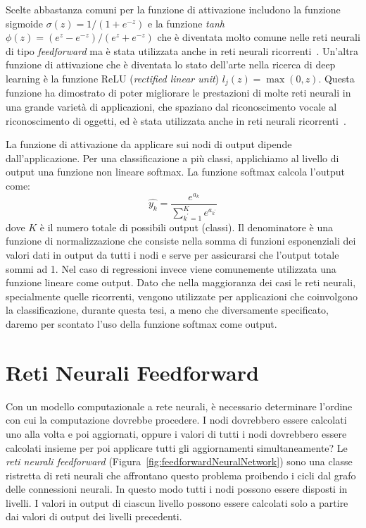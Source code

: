 Scelte abbastanza comuni per la funzione di attivazione includono la funzione
sigmoide $\sigma(z) = 1/(1+e^{-z})$ e la funzione \emph{tanh}
$\phi(z)=(e^z-e^{-z})/(e^z+e^{-z})$ che \`e diventata molto comune nelle reti
neurali di tipo \emph{feedforward} ma \`e stata utilizzata anche in reti neurali
ricorrenti~\cite{Sutskever:2011}. Un'altra funzione di attivazione che \`e
diventata lo stato dell'arte nella ricerca di deep learning \`e la funzione
ReLU (\emph{rectified linear unit}) $l_j(z)=\operatorname{max}(0, z)$. Questa
funzione ha dimostrato di poter migliorare le prestazioni di molte reti neurali
in una grande variet\`a di applicazioni, che spaziano dal riconoscimento vocale
al riconoscimento di oggetti, ed \`e stata utilizzata anche in reti neurali
ricorrenti~\cite{Bengio:2013}.

La funzione di attivazione da applicare sui nodi di output dipende dall'applicazione.
Per una classificazione a pi\`u classi, applichiamo al livello di output una
funzione non lineare softmax. La funzione softmax calcola l'output come:
\begin{equation}
  \hat{y_k} = \frac{e^{a_k}}{\sum_{k^{'}=1}^{K} e^{a_{k^{'}}}}
\end{equation}
dove $K$ \`e il numero totale di possibili output (classi). Il denominatore \`e
una funzione di normalizzazione che consiste nella somma di funzioni esponenziali
dei valori dati in output da tutti i nodi e serve per assicurarsi che l'output
totale sommi ad 1. Nel caso di regressioni invece viene comunemente utilizzata
una funzione lineare come output. Dato che nella maggioranza dei casi le reti
neurali, specialmente quelle ricorrenti, vengono utilizzate per applicazioni che
coinvolgono la classificazione, durante questa tesi, a meno che diversamente
specificato, daremo per scontato l'uso della funzione softmax come output.

\section{Reti Neurali Feedforward}

Con un modello computazionale a rete neurali, \`e necessario determinare
l'ordine con cui la computazione dovrebbe procedere. I nodi dovrebbero essere
calcolati uno alla volta e poi aggiornati, oppure i valori di tutti i nodi
dovrebbero essere calcolati insieme per poi applicare tutti gli aggiornamenti
simultaneamente? Le \emph{reti neurali feedforward}
(Figura~\ref{fig:feedforwardNeuralNetwork}) sono una classe ristretta di reti
neurali che affrontano questo problema proibendo i cicli dal grafo delle
connessioni neurali. In questo modo tutti i nodi possono essere disposti in
livelli. I valori in output di ciascun livello possono essere calcolati solo a
partire dai valori di output dei livelli precedenti.

